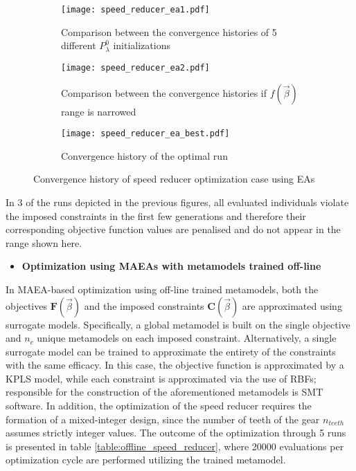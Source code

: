 \begin{figure}[h!]
\centering
	\begin{subfigure}[b]{0.47\textwidth}
    \centering
    \caption{Comparison between the convergence histories of 5 
    different $P_{λ}^{0}$ initializations}
    \texttt{[image: speed\_reducer\_ea1.pdf]}    
    \end{subfigure}
    \hfill
    \begin{subfigure}[b]{0.47\textwidth}
    \centering
    \caption{Comparison between the convergence histories if 
    $f(\vec{β})$ range is narrowed}
    \texttt{[image: speed\_reducer\_ea2.pdf]}    
    \end{subfigure}  
    \hfill
    \begin{subfigure}[b]{0.47\textwidth}
    \centering
    \caption{Convergence history of the optimal run}
    \texttt{[image: speed\_reducer\_ea\_best.pdf]}    
    \end{subfigure} 
\caption{Convergence history of speed reducer optimization case 
using EAs} 
\label{fig:EAs_speed_reducer}
\end{figure}

In 3 of the runs depicted in the previous figures, all 
evaluated individuals violate the imposed constraints in the first 
few generations and therefore their corresponding objective 
function values are penalised and do not appear in the range shown 
here. 

\newpage

\begin{itemize}
\item \textbf{Optimization using MAEAs with metamodels trained 
off-line}
\end{itemize}

In MAEA-based optimization using off-line trained metamodels, both 
the objectives $\mathbf{F}(\vec{β})$ and the imposed constraints 
$\mathbf{C}(\vec{β})$ are approximated using surrogate models. 
Specifically, a global metamodel is built on the single objective 
and $n_{c}$ unique metamodels on each imposed constraint. 
Alternatively, a single surrogate model can be trained to 
approximate the entirety of the constraints with the same efficacy. 
In this case, the objective function is approximated by a KPLS 
model, while each constraint is approximated via the use of RBFs; 
responsible for the construction of the aforementioned metamodels 
is SMT software. In addition, the optimization of the speed reducer 
requires the formation of a mixed-integer design, since the number 
of teeth of the gear $n_{teeth}$ assumes strictly integer values. 
The outcome of the optimization through 5 runs is presented in 
table \ref{table:offline_speed_reducer}, where 20000 
evaluations per optimization cycle are performed utilizing the 
trained metamodel.
  

